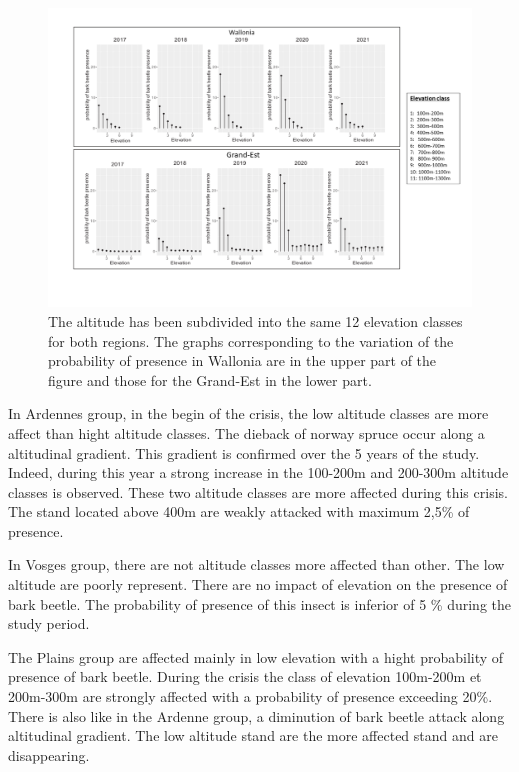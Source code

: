 \documentclass[3p,procedia]{elsarticle}
\begin{document}
\begin{figure}
\centering
	\includegraphics[width=\textwidth]{graphe_wall_GDE.png}
     \caption{The altitude has been subdivided into the same 12 elevation classes for both regions. 
The graphs corresponding to the variation of the probability of presence in Wallonia are in the upper part of the figure and those for the Grand-Est in the lower part.
}
	\label{alti_sco}
\end{figure}

In Ardennes group, in the begin of the crisis, the low altitude classes are more affect than hight altitude classes.
The dieback of norway spruce occur along a altitudinal  gradient.
This gradient is confirmed over the 5 years of the study.
Indeed, during this year a strong increase in the 100-200m and 200-300m altitude classes is observed. 
These two altitude classes are more affected during this crisis.
The stand located above 400m are weakly attacked with maximum 2,5\% of presence.


In Vosges group, there are not altitude classes more affected than other. 
The low altitude are poorly represent. There are no impact of elevation on the presence of bark beetle. 
The probability of presence of this insect is inferior of 5 \% during the study period.


The Plains group are affected mainly in low elevation with a hight probability of presence of bark beetle. 
During the crisis the class of elevation 100m-200m et 200m-300m are strongly affected with a probability of presence exceeding 20\%.
There is also like in the Ardenne group, a diminution of bark beetle attack along altitudinal gradient.
The low altitude stand are the more affected stand and are disappearing.
\end{document}
